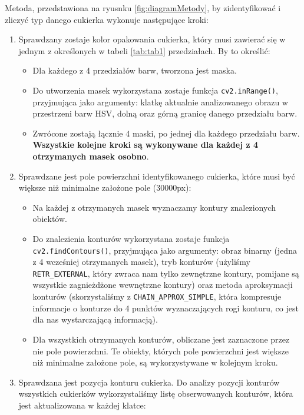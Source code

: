 \documentclass{article}
\begin{document}
Metoda, przedstawiona na ryusnku \ref{fig:diagramMetody}, by zidentyfikować i zliczyć typ danego cukierka wykonuje następujące kroki:
\begin{enumerate}
    \item Sprawdzany zostaje kolor opakowania cukierka, który musi zawierać się w jednym z określonych w tabeli \ref{tab:tab1} przedziałach. By to określić:
    \begin{itemize}
        \item Dla każdego z 4 przedziałów barw, tworzona jest maska.
        \item Do utworzenia masek wykorzystana zostaje funkcja \verb|cv2.inRange()|\cite{inRange}, przyjmująca jako argumenty: klatkę aktualnie analizowanego obrazu w przestrzeni barw HSV, dolną oraz górną granicę danego przedziału barw.
        \item Zwrócone zostają łącznie 4 maski, po jednej dla każdego przedziału barw. \textbf{Wszystkie kolejne kroki są wykonywane dla każdej z 4 otrzymanych masek osobno}.
    \end{itemize}
    \item Sprawdzane jest pole powierzchni identyfikowanego cukierka, które musi być większe niż minimalne założone pole (30000px):
    \begin{itemize}
        \item Na każdej z otrzymanych masek wyznaczamy kontury znalezionych obiektów.
        \item Do znalezienia konturów wykorzystana zostaje funkcja \verb|cv2.findContours()|\cite{findContours}, przyjmująca jako argumenty: obraz binarny (jedna z 4 wcześniej otrzymanych masek), tryb konturów (użyliśmy \verb|RETR_EXTERNAL|, który zwraca nam tylko zewnętrzne kontury, pomijane są wszystkie zagnieżdżone wewnętrzne kontury) oraz metoda aproksymacji konturów (skorzystaliśmy z \verb|CHAIN_APPROX_SIMPLE|, która kompresuje informacje o konturze do 4 punktów wyznaczających rogi konturu, co jest dla nas wystarczającą informacją).
        \item Dla wszystkich otrzymanych konturów, obliczane jest zaznaczone przez nie pole powierzchni. Te obiekty, których pole powierzchni jest większe niż minimalne założone pole, są wykorzystywane w kolejnym kroku.
    \end{itemize}
    \item Sprawdzana jest pozycja konturu cukierka. Do analizy pozycji konturów wszystkich cukierków wykorzystaliśmy listę obserwowanych konturów, która jest aktualizowana w każdej klatce:
    \begin{itemize}

\end{itemize}
\end{enumerate}
\end{document}
